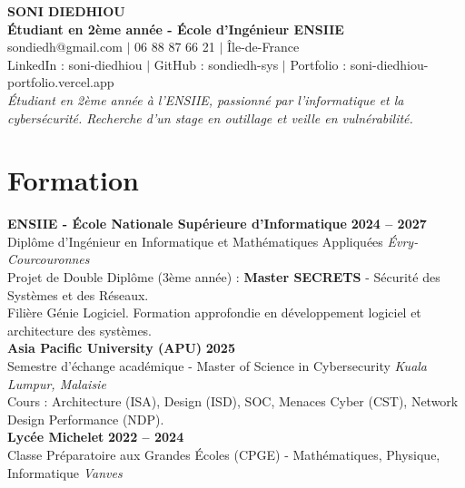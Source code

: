 \documentclass[10pt, a4paper]{article}
\begin{document}
\begin{center}
    {\Huge \bfseries SONI DIEDHIOU} \\
    \vspace{4pt}
    {\large \bfseries Étudiant en 2ème année - École d'Ingénieur ENSIIE} \\
    \vspace{6pt}
    \small
    sondiedh@gmail.com $|$ 06 88 87 66 21 $|$ Île-de-France \\
    \vspace{2pt}
    LinkedIn : soni-diedhiou $|$ 
    GitHub : sondiedh-sys $|$ 
    Portfolio : soni-diedhiou-portfolio.vercel.app \\
    \vspace{4pt}
    \textit{Étudiant en 2ème année à l'ENSIIE, passionné par l'informatique et la cybersécurité. Recherche d'un stage en outillage et veille en vulnérabilité.}
\end{center}

\section{Formation}
\textbf{ENSIIE - École Nationale Supérieure d'Informatique} \hfill \textbf{2024 -- 2027} \\
Diplôme d'Ingénieur en Informatique et Mathématiques Appliquées \hfill \textit{Évry-Courcouronnes} \\
Projet de Double Diplôme (3ème année) : \textbf{Master SECRETS} - Sécurité des Systèmes et des Réseaux. \\
Filière Génie Logiciel. Formation approfondie en développement logiciel et architecture des systèmes. \\

\vspace{4pt}
\textbf{Asia Pacific University (APU)} \hfill \textbf{2025} \\
Semestre d'échange académique - Master of Science in Cybersecurity \hfill \textit{Kuala Lumpur, Malaisie} \\
Cours : Architecture (ISA), Design (ISD), SOC, Menaces Cyber (CST), Network Design Performance (NDP). \\

\vspace{4pt}
\textbf{Lycée Michelet} \hfill \textbf{2022 -- 2024} \\
Classe Préparatoire aux Grandes Écoles (CPGE) - Mathématiques, Physique, Informatique \hfill \textit{Vanves} \\
\end{document}
